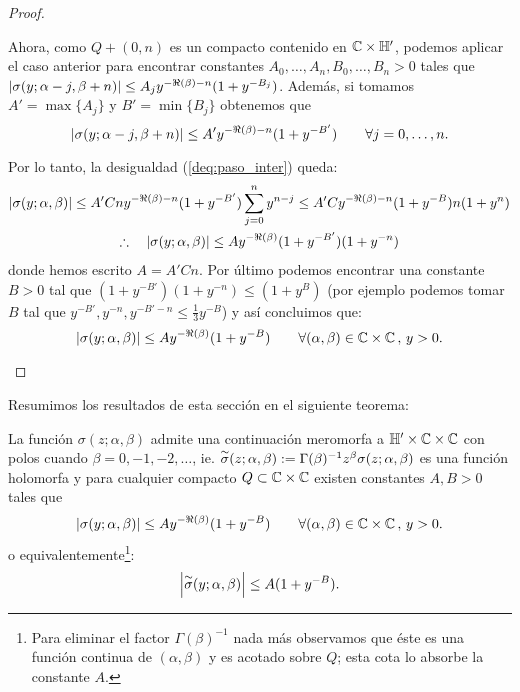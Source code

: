 \begin{proof}
\begin{itemize}
  Ahora, como $Q+(0,n)$ es un compacto contenido en $\mathbb{C}\times\mathbb{H}'$, podemos aplicar el
  caso anterior para encontrar constantes $A_0,\ldots,A_n,B_0,\ldots,B_n>0$ tales que
  $\left| \sigma(y;\alpha-j,\beta+n) \right|\leq A_jy^{-\Re(\beta)-n}(1+y^{-B_j})$. Adem\'as, si tomamos
  $A'=\max\{A_j\}$ y $B'=\min\{B_j\}$ obtenemos que
  \[
    \left| \sigma(y;\alpha-j,\beta+n) \right|\leq A' y^{-\Re(\beta)-n}(1+y^{-B'}) \qquad\forall j=0,\ldots,n.
  \]

  Por lo tanto, la desigualdad (\ref{deq:paso_inter}) queda:
  \begin{gather*}
    \left| \sigma(y;\alpha,\beta) \right|\leq A'Cny^{-\Re(\beta)-n}(1+y^{-B'})\sum_{j=0}^ny^{n-j}
    \leq A'Cy^{-\Re(\beta)-n}(1+y^{-B})n(1+y^n)\\
    \therefore\quad\left| \sigma(y;\alpha,\beta) \right|\leq Ay^{-\Re(\beta)}(1+y^{-B'})(1+y^{-n})
  \end{gather*}
  donde hemos escrito $A=A'Cn$. Por \'ultimo podemos encontrar una constante $B>0$
  tal que $(1+y^{-B'})(1+y^{-n})\leq(1+y^B)$ (por ejemplo podemos tomar $B$ tal que
  $y^{-B'},y^{-n},y^{-B'-n}\leq \tfrac{1}{3}y^{-B}$) y as\'i concluimos que:
  \[
    \left| \sigma(y;\alpha,\beta) \right|\leq Ay^{-\Re(\beta)}(1+y^{-B})
    \qquad\forall (\alpha,\beta)\in\mathbb{C}\times\mathbb{C} \, ,\, y>0.
  \]
\end{itemize}
\end{proof}

Resumimos los resultados de esta secci\'on en el siguiente teorema:

\begin{thm}\label{thm:prop_sigma}
  La funci\'on $\sigma(z;\alpha,\beta)$ admite una continuaci\'on meromorfa a $\mathbb{H}'\times\mathbb{C}\times\mathbb{C}$
  con polos cuando $\beta=0,-1,-2,\ldots$, ie.
  $\overset{\sim}{\sigma}(z;\alpha,\beta):=\Gamma(\beta)^{-1}z^{\beta}\sigma(z;\alpha,\beta)$ es una funci\'on
  holomorfa y para cualquier compacto $Q\subset\mathbb{C}\times\mathbb{C}$ existen constantes $A,B>0$ tales que
  \[
    \left| \sigma(y;\alpha,\beta) \right|\leq Ay^{-\Re(\beta)}(1+y^{-B})
    \qquad \forall (\alpha,\beta)\in\mathbb{C}\times\mathbb{C} \, ,\, y>0.
  \]
  o equivalentemente\footnote{Para eliminar el factor $\Gamma(\beta)^{-1}$ nada m\'as observamos
    que \'este es una funci\'on continua de $(\alpha,\beta)$ y es acotado sobre $Q$; esta cota lo
    absorbe la constante $A$.}:
  \[
    \left| \overset{\sim}{\sigma}(y;\alpha,\beta) \right|\leq A(1+y^{-B}).
  \]
\end{thm}